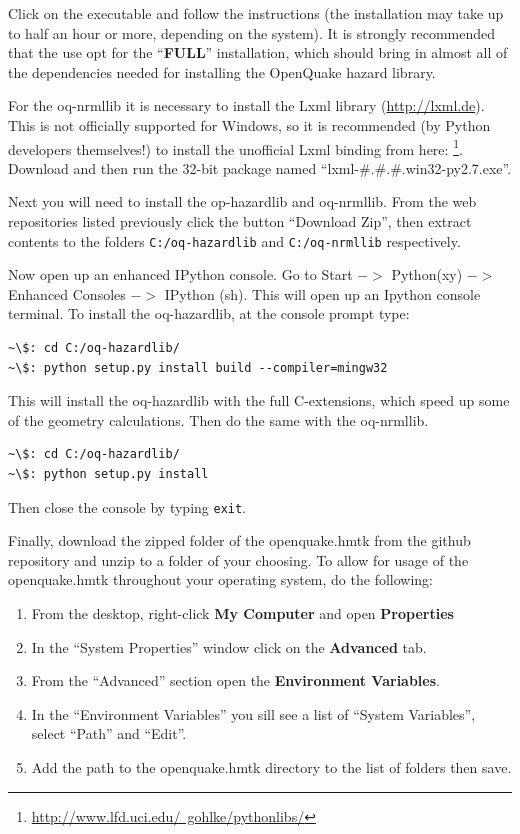 Click on the executable and follow the instructions (the installation may take up to half an hour or more, depending on the system). It is strongly recommended that the use opt for the ``\textbf{FULL}'' installation, which should bring in almost all of the dependencies needed for installing the OpenQuake hazard library. 

For the oq-nrmllib it is necessary to install the Lxml library (\href{http://lxml.de}{http://lxml.de}). This is not officially supported for Windows, so it is recommended (by Python developers themselves!) to install the unofficial Lxml binding from here: \footnote{\href{http://www.lfd.uci.edu/~gohlke/pythonlibs/}{http://www.lfd.uci.edu/~gohlke/pythonlibs/}}. Download and then run the 32-bit package named ``lxml-\#.\#.\#.win32-py2.7.exe''.

Next you will need to install the op-hazardlib and oq-nrmllib. From the web repositories listed previously click the button ``Download Zip'', then extract contents to the folders \verb=C:/oq-hazardlib= and \verb=C:/oq-nrmllib= respectively.

Now open up an enhanced IPython console. Go to Start $->$ Python(xy) $->$ Enhanced Consoles $->$ IPython (sh). This will open up an Ipython console terminal. To install the oq-hazardlib, at the console prompt type:

\begin{Verbatim}[frame=single, commandchars=\\\{\}, fontsize=\scriptsize]
~\$: cd C:/oq-hazardlib/
~\$: python setup.py install build --compiler=mingw32
\end{Verbatim}

This will install the oq-hazardlib with the full C-extensions, which speed up some of the geometry calculations. Then do the same with the oq-nrmllib.

\begin{Verbatim}[frame=single, commandchars=\\\{\}, fontsize=\scriptsize]
~\$: cd C:/oq-hazardlib/
~\$: python setup.py install
\end{Verbatim}

Then close the console by typing \verb=exit=. 

Finally, download the zipped folder of the openquake.hmtk from the github repository and unzip to a folder of your choosing. To allow for usage of the openquake.hmtk throughout your operating system, do the following: 

\begin{enumerate}
\item From the desktop, right-click \textbf{My Computer} and open \textbf{Properties}
\item In the ``System Properties'' window click on the \textbf{Advanced} tab.
\item From the ``Advanced'' section open the \textbf{Environment Variables}.
\item In the ``Environment Variables'' you sill see a list of ``System Variables'', select ``Path'' and ``Edit''.
\item Add the path to the openquake.hmtk directory to the list of folders then save.
\end{enumerate}

